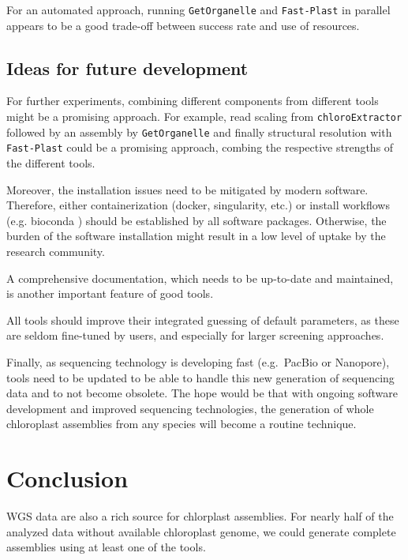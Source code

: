 \documentclass{bmcart}
\newcommand{\todo}[1]{\textcolor{red}{\bfseries(ToDO: #1})}
\newcommand{\formatprogramnames}[1]{\texttt{#1}}
\newcommand{\ce}{\formatprogramnames{chloroExtractor}}
\newcommand{\fp}{\formatprogramnames{Fast-Plast}}
\newcommand{\go}{\formatprogramnames{GetOrganelle}}
\begin{document}
For an automated approach, running \go{} and \fp{} in parallel appears to be a good trade-off between success rate and use of resources.

\subsection*{Ideas for future development}
For further experiments, combining different components from different tools might be a promising approach.
For example, read scaling from \ce{} followed by an assembly by \go{} and finally structural resolution with \fp{} could be a promising approach, combing the respective strengths of the different tools.

Moreover, the installation issues need to be mitigated by modern software.
Therefore, either containerization (docker, singularity, etc.) or install workflows (e.g. bioconda \cite{gruening2018}) should be established by all software packages.
Otherwise, the burden of the software installation might result in a low level of uptake by the research community.

A comprehensive documentation, which needs to be up-to-date and maintained, is another important feature of good tools.

All tools should improve their integrated guessing of default parameters, as these are seldom fine-tuned by users, and especially for larger screening approaches.

Finally, as sequencing technology is developing fast (e.g.\ PacBio or Nanopore), tools need to be updated to be able to handle this new generation of sequencing data and to not become obsolete.
The hope would be that with ongoing software development and improved sequencing technologies, the generation of whole chloroplast assemblies from any species will become a routine technique.

\section*{Conclusion}

WGS data are also a rich source for chlorplast assemblies.
For nearly half of the analyzed data without available chloroplast genome, we could generate complete assemblies using at least one of the tools.
\end{document}
